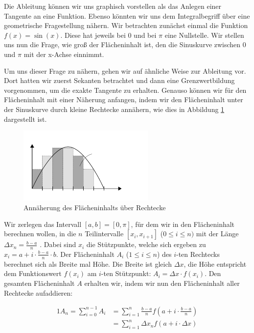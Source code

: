 Die Ableitung können wir uns graphisch vorstellen als das Anlegen einer Tangente an eine Funktion. Ebenso könnten wir uns dem Integralbegriff über eine geometrische Fragestellung nähern. Wir betrachten zunächst einmal die Funktion $f(x) = \sin(x)$. Diese hat jeweils bei $0$ und bei $\pi$ eine Nullstelle. Wir stellen uns nun die Frage, wie groß der Flächeninhalt ist, den die Sinuskurve zwischen $0$ und $\pi$ mit der x-Achse einnimmt.

Um uns dieser Frage zu nähern, gehen wir auf ähnliche Weise zur Ableitung vor. Dort hatten wir zuerst Sekanten betrachtet und dann eine Grenzwertbildung vorgenommen, um die exakte Tangente zu erhalten. Genauso können wir für den Flächeninhalt mit einer Näherung anfangen, indem wir den Flächeninhalt unter der Sinuskurve durch kleine Rechtecke annähern, wie dies in Abbildung \ref{fig:ApproxAreaUnivarFun} dargestellt ist.

\begin{figure}
    \centering
    \includegraphics[width=0.6\textwidth]{./svg/integral-univariate-function}
    \caption{Annäherung des Flächeninhalts über Rechtecke}
    \label{fig:ApproxAreaUnivarFun}
\end{figure}

Wir zerlegen das Intervall $[a, b] = [0,\pi]$, für dem wir in den Flächeninhalt berechnen wollen, in die $n$ Teilintervalle $[x_i, x_{i+1}]$ ($0\le i \le n)$ mit der Länge $\Delta x_n = \frac{b-a}{n}$ . Dabei sind $x_i$ die Stützpunkte, welche sich ergeben zu $x_i = a + i\cdot\frac{b-a}{n} \cdot b$. Der Flächeninhalt $A_i$ ($1\le i \le n$) des $i$-ten Rechtecks berechnet sich als Breite mal Höhe. Die Breite ist gleich $\Delta x$, die Höhe entspricht dem Funktionswert $f(x_i)$ am $i$-ten Stützpunkt: $A_i = \Delta x \cdot f(x_i)$. Den gesamten Flächeninhalt $A$ erhalten wir, indem wir nun den Flächeninhalt aller Rechtecke aufaddieren:

\begin{alignat*}{1}
  A_n = \sum_{i=0}^{n-1} A_i &= \sum_{i=1}^{n} \frac{b-a}{n} f(a + i\cdot\frac{b-a}{n}) \\
                             &= \sum_{i=1}^{n} \Delta x_n f(a + i\cdot\Delta x) \\
\end{alignat*}

